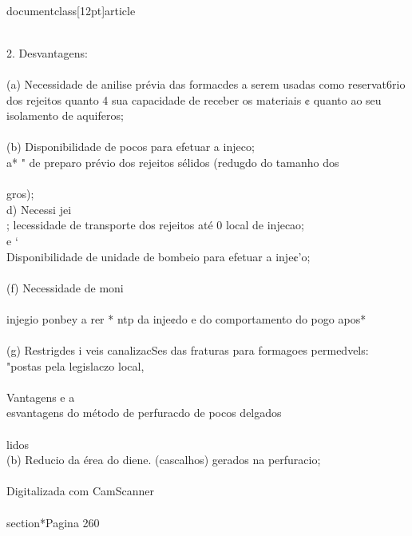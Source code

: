 \\documentclass[12pt]{article}
\begin{document}
{{{{\\
2. Desvantagens:\\
\\
(a) Necessidade de anilise prévia das formacdes a serem usadas como reservat6rio\\
dos rejeitos quanto 4 sua capacidade de receber os materiais ¢ quanto ao seu\\
isolamento de aquiferos;\\
\\
(b) Disponibilidade de pocos para efetuar a injeco;\\
a* " de preparo prévio dos rejeitos sélidos (redugdo do tamanho dos\\
\\
gros);\\
d) Necessi jei\\
; lecessidade de transporte dos rejeitos até 0 local de injecao;\\
e ‘\\
Disponibilidade de unidade de bombeio para efetuar a inje¢’o;\\
\\
(f) Necessidade de moni\\
\\
injegio ponbey a rer * ntp da inje¢do e do comportamento do pogo apos*\\
\\
(g) Restrigdes i veis canalizacSes das fraturas para formagoes permedvels:\\
"postas pela legislaczo local,\\
\\
Vantagens e a\\
esvantagens do método de perfuracdo de pocos delgados\\
\\
lidos\\
(b) Reducio da érea do diene. (cascalhos) gerados na perfuracio;\\
\\
Digitalizada com CamScanner\\

\\section*{Pagina 260}

}}}}
\end{document}
